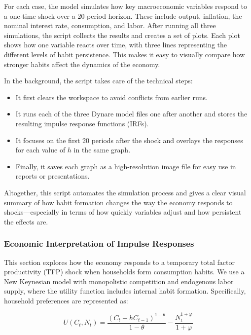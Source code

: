 \documentclass[12pt,a4paper,notitlepage]{article}
\numberwithin{equation}{section}
\begin{document}
\begin{itemize}
\begin{itemize}
\vspace{1em}

For each case, the model simulates how key macroeconomic variables respond to a one-time shock over a 20-period horizon. These include output, inflation, the nominal interest rate, consumption, and labor. After running all three simulations, the script collects the results and creates a set of plots. Each plot shows how one variable reacts over time, with three lines representing the different levels of habit persistence. This makes it easy to visually compare how stronger habits affect the dynamics of the economy.

In the background, the script takes care of the technical steps:
\begin{itemize}
    \item It first clears the workspace to avoid conflicts from earlier runs.
    \item It runs each of the three Dynare model files one after another and stores the resulting impulse response functions (IRFs).
    \item It focuses on the first 20 periods after the shock and overlays the responses for each value of \( h \) in the same graph.
    \item Finally, it saves each graph as a high-resolution image file for easy use in reports or presentations.
\end{itemize}

Altogether, this script automates the simulation process and gives a clear visual summary of how habit formation changes the way the economy responds to shocks—especially in terms of how quickly variables adjust and how persistent the effects are.





\subsubsection{Economic Interpretation of Impulse Responses}

This section explores how the economy responds to a temporary total factor productivity (TFP) shock when households form consumption habits. We use a New Keynesian model with monopolistic competition and endogenous labor supply, where the utility function includes internal habit formation. Specifically, household preferences are represented as:

\[
U(C_t, N_t) = \frac{(C_t - h C_{t-1})^{1 - \theta}}{1 - \theta} - \frac{N_t^{1 + \varphi}}{1 + \varphi}
\]


\end{itemize}
\end{itemize}
\end{document}
